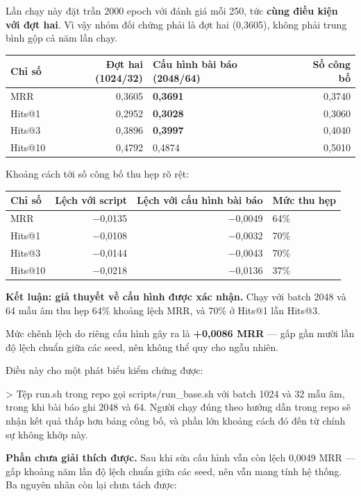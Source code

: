 \documentclass[11pt,a4paper]{article}
\newcommand{\code}[1]{{\ttfamily\small\color{codetext}#1}}
\begin{document}
Lần chạy này đặt trần 2000 epoch với đánh giá mỗi 250, tức \textbf{cùng điều kiện với đợt hai}. Vì vậy nhóm đối chứng phải là đợt hai (0,3605), không phải trung bình gộp cả năm lần chạy.

\begin{center}\small
\begin{tabular}{@{}lrlr@{}}
\toprule
\textbf{Chỉ số} & \textbf{Đợt hai (1024/32)} & \textbf{Cấu hình bài báo (2048/64)} & \textbf{Số công bố}\\
\midrule
MRR & 0,3605 & \textbf{0,3691} & 0,3740\\
Hits@1 & 0,2952 & \textbf{0,3028} & 0,3060\\
Hits@3 & 0,3896 & \textbf{0,3997} & 0,4040\\
Hits@10 & 0,4792 & 0,4874 & 0,5010\\
\bottomrule
\end{tabular}
\end{center}
Khoảng cách tới số công bố thu hẹp rõ rệt:

\begin{center}\small
\begin{tabular}{@{}lrrl@{}}
\toprule
\textbf{Chỉ số} & \textbf{Lệch với script} & \textbf{Lệch với cấu hình bài báo} & \textbf{Mức thu hẹp}\\
\midrule
MRR & −0,0135 & −0,0049 & 64\%\\
Hits@1 & −0,0108 & −0,0032 & 70\%\\
Hits@3 & −0,0144 & −0,0043 & 70\%\\
Hits@10 & −0,0218 & −0,0136 & 37\%\\
\bottomrule
\end{tabular}
\end{center}
\textbf{Kết luận: giả thuyết về cấu hình được xác nhận.} Chạy với batch 2048 và 64 mẫu âm thu hẹp 64\% khoảng lệch MRR, và 70\% ở Hits@1 lẫn Hits@3.

Mức chênh lệch do riêng cấu hình gây ra là \textbf{+0,0086 MRR} --- gấp gần mười lần độ lệch chuẩn giữa các seed, nên không thể quy cho ngẫu nhiên.

Điều này cho một phát biểu kiểm chứng được:

> Tệp \code{run.sh} trong repo gọi \code{scripts/run\_base.sh} với batch 1024 và 32 mẫu âm, trong khi bài báo ghi 2048 và 64. Người chạy đúng theo hướng dẫn trong repo sẽ nhận kết quả thấp hơn bảng công bố, và phần lớn khoảng cách đó đến từ chính sự không khớp này.

\textbf{Phần chưa giải thích được.} Sau khi sửa cấu hình vẫn còn lệch 0,0049 MRR --- gấp khoảng năm lần độ lệch chuẩn giữa các seed, nên vẫn mang tính hệ thống. Ba nguyên nhân còn lại chưa tách được:
\end{document}
